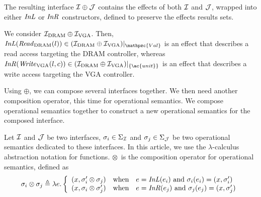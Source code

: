 The resulting interface $\mathcal{I} \oplus \mathcal{J}$ contains the effects of both $\mathcal{I}$ and
$\mathcal{J}$, wrapped into either $\mathit{InL}$ or $\mathit{InR}$ constructors, defined to
preserve the effects results sets.
%

\begin{example}
  We consider $\mathcal{I}_{\mathrm{DRAM}} \oplus \mathcal{I}_{\mathrm{VGA}}$. Then,
  $\func{InL}(\func{Read}_{\mathrm{DRAM}}(l)) \in \Interface{(\I_{\mathrm{DRAM}}
    \oplus \I_{\mathrm{VGA}})}{\mathpzc{Val}}$ is an effect that describes a
  read access targeting the DRAM controller, whereas
  $\func{InR}(\func{Write}_{\mathrm{VGA}}(l, c)) \in
  \Interface{(\I_{\mathrm{DRAM}} \oplus \I_{\mathrm{VGA}})}{\{\ac{unit}\}}$ is
  an effect that describes a write access targeting the VGA controller.
\end{example}

Using $\oplus$, we can compose several interfaces together.
%
We then need another composition operator, this time for operational semantics.
%
We compose operational semantics together to construct a new operational
semantics for the composed interface.

\begin{definition} \label{def:freespec:semantics-composition} Let $\mathcal{I}$ and $\mathcal{J}$ be
  two interfaces, $\sigma_i \in \Sigma_{\mathcal{I}}$ and $\sigma_j \in \Sigma_{\mathcal{J}}$ be
  two operational semantics dedicated to these interfaces.
  In this article, we use the $\lambda$-calculus abstraction notation for
  functions.
  $\otimes$~is the composition operator for operational semantics, defined as
  \[ \sigma_i \otimes \sigma_j \triangleq \lambda e. \left \{
      \begin{array}{lcl}
        (x, \sigma_i' \otimes \sigma_j) & \text{when} & e =
                                                        \mathit{InL}(e_i)
                                                        \text{ and }
                                                        \sigma_i(e_i)
                                                        = (x,
                                                        \sigma_i') \\
        (x, \sigma_i \otimes \sigma_j') & \text{when} & e =
                                                        \mathit{InR}(e_j)
                                                        \text{ and }
                                                        \sigma_j(e_j)
                                                        = (x, \sigma_j')
      \end{array}
    \right.
  \]
\end{definition}

